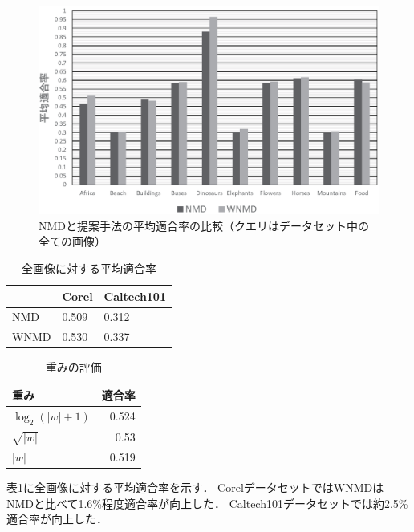 \begin{figure}[tb]
\begin{center}
\includegraphics[clip, width=\columnwidth]{image/NMDvsProposed.eps}
\caption{NMDと提案手法の平均適合率の比較（クエリはデータセット中の全ての画像）}
\label{fig:NMDvsProposed.eps}
\end{center}
\end{figure}
\begin{table}
\caption{全画像に対する平均適合率}
\label{tab:Average_NMDvsProposed}
\begin{center}
\begin{tabular}{|l||l|l|}
\hline
&Corel&Caltech101 \\
\hline
NMD  & 0.509 & 0.312\\
\hline
WNMD & 0.530 & 0.337\\
\hline
\end{tabular}
\end{center}
\end{table}

\begin{table}[htbp]
\centering
\caption{重みの評価}
\begin{tabular}{|l|r|}
\hline
\textbf{重み} &
\multicolumn{1}{l|}{\textbf{適合率}}
\bigstrut\\
\hline
$\log_2 (|w|+1)$ &
0.524
\bigstrut\\
\hline
$\sqrt{|w|}$ &
0.53
\bigstrut\\
\hline
$|w|$ &
0.519
\bigstrut\\
\hline
    \end{tabular}%
  \label{tab:NMD_weight_compare}%
\end{table}%

表\ref{tab:Average_NMDvsProposed}に全画像に対する平均適合率を示す．
CorelデータセットではWNMDはNMDと比べて1.6\%程度適合率が向上した．
Caltech101データセットでは約2.5\%適合率が向上した．


